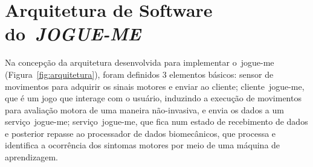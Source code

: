 \chapter{Arquitetura de Software do~\textit{JOGUE-ME}}\label{chapter:arquitetura_captura}
Na concepção da arquitetura desenvolvida para implementar o~\ac{jogue-me} (Figura~\ref{fig:arquitetura}), foram definidos 3 elementos básicos: sensor de movimentos para adquirir os sinais motores e enviar ao cliente; cliente~\ac{jogue-me}, que é um jogo que interage com o usuário, induzindo a execução de movimentos para avaliação motora de uma maneira não-invasiva, e envia os dados a um serviço~\ac{jogue-me}; serviço~\ac{jogue-me}, que fica num estado de recebimento de dados e posterior repasse ao processador de dados biomecânicos, que processa e identifica a ocorrência dos sintomas motores por meio de uma máquina de aprendizagem.








